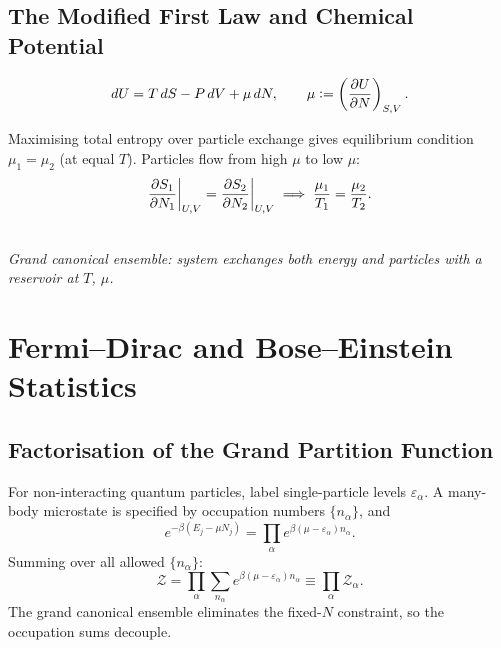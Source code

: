 \subsection{The Modified First Law and Chemical Potential}

\begin{equation}
    dU = T\,dS - P\,dV + \mu\,dN, \qquad \mu \vcentcolon= \left(\pdv{U}{N}\right)_{S,V}.
\end{equation}

Maximising total entropy over particle exchange gives equilibrium condition $\mu_1 = \mu_2$ (at equal $T$). Particles flow from high $\mu$ to low $\mu$:
\begin{equation}
    \pdv{S_1}{N_1}\bigg|_{U,V} = \pdv{S_2}{N_2}\bigg|_{U,V}
    \implies \frac{\mu_1}{T_1} = \frac{\mu_2}{T_2}.
\end{equation}

\begin{center}
\\[3pt]
{\small\itshape Grand canonical ensemble: system exchanges both energy and particles with
a reservoir at $T$, $\mu$.}
\end{center}

\section{Fermi--Dirac and Bose--Einstein Statistics}

\subsection{Factorisation of the Grand Partition Function}

For non-interacting quantum particles, label single-particle levels $\varepsilon_\alpha$.
A many-body microstate is specified by occupation numbers $\{n_\alpha\}$, and
\begin{equation}
    e^{-\beta(E_j - \mu N_j)}
    = \prod_\alpha e^{\beta(\mu-\varepsilon_\alpha)n_\alpha}.
\end{equation}
Summing over all allowed $\{n_\alpha\}$:
\begin{equation}
    \mathcal{Z} = \prod_\alpha \sum_{n_\alpha} e^{\beta(\mu-\varepsilon_\alpha)n_\alpha}
    \equiv \prod_\alpha \mathcal{Z}_\alpha.
\end{equation}
The grand canonical ensemble eliminates the fixed-$N$ constraint, so the occupation sums decouple.

